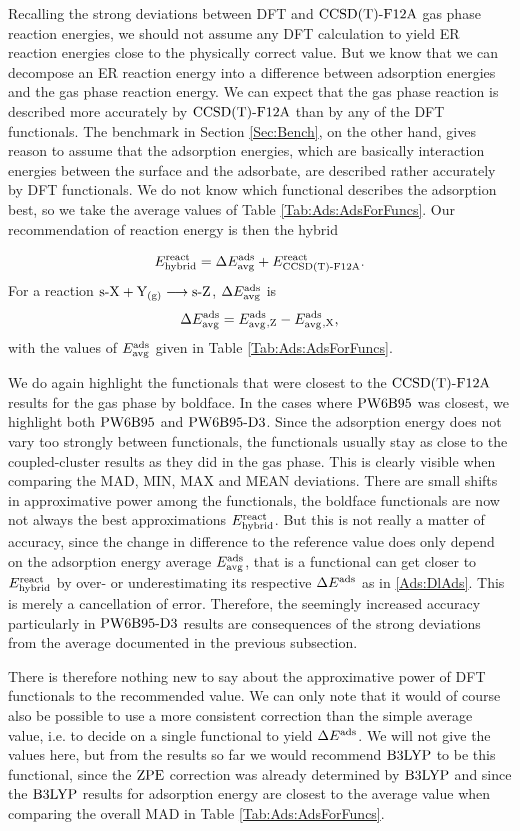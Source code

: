 \documentclass[8.5pt,twoside,twocolumn]{article}
\newcommand\zpe{\enmat{\te{ZPE}}}
\newcommand\eads{\enmat{E^{\te{ads}}}}
\newcommand\ere{\enmat{E^{\te{react}}}}
\newcommand\sur{\enmat{\te{s-}}}
\newcommand\gas{\enmat{_\te{(g)}}}
\theoremstyle{standard}
\begin{document}
Recalling the strong deviations between DFT and $\text{CCSD(T)-F12A}$ gas phase
reaction energies, we should not assume any DFT calculation to yield
ER reaction energies close to the physically correct value. But we know
that we can decompose an ER reaction energy into a difference between
adsorption energies and the gas phase reaction energy. We can expect that
the gas phase reaction is described more accurately by $\text{CCSD(T)-F12A}$ than by
any of the DFT functionals. The benchmark in Section \ref{Sec:Bench}, on
the other hand, gives reason to assume that the adsorption energies, which
are basically interaction energies between the surface and the adsorbate,
are described rather accurately by DFT functionals. We do not know which
functional describes the adsorption best, so we take the average values
of Table \ref{Tab:Ads:AdsForFuncs}. Our recommendation of reaction
energy is then the hybrid

\begin{equation}
 \erehyb=\Dl\avg + \ere_{\ccsdtf}.
\end{equation}
For a reaction $\sur\X+\Y\gas\chemar\sur\Z$, $\Delta E_{\text {avg}}^{\text{ads}}$ is
\begin{equation}
 \Delta E_{\text {avg}}^{\text{ads}} = E_{\text {avg}}^{\text{ads}}{_{,\text Z}} - E_{\text {avg}}^{\text{ads}}{_{,\text X}},
 \label{Ads:DlAds}
\end{equation}
with the values of $E_{\text {avg}}^{\text{ads}}$ given in Table \ref{Tab:Ads:AdsForFuncs}. 

We do again highlight the functionals that were closest to the $\text{CCSD(T)-F12A}$
results for the gas phase by boldface. In the cases where $\text{PW6B95}$ was closest,
we highlight both $\text{PW6B95}$ and $\text{PW6B95}\text{-D3}$. Since the adsorption energy does not vary too 
strongly between functionals, the functionals usually stay 
as close to the coupled-cluster results as they did in the gas phase. This
is clearly visible when comparing the MAD, MIN, MAX and MEAN deviations.
There are small shifts in approximative power among the functionals,
the boldface functionals are now not always the best approximations $\erehyb$.
But this is not really a matter of accuracy, since the change in difference
to the reference value does only depend on the adsorption energy average $E_{\text {avg}}^{\text{ads}}$,
that is a functional can get closer to $\erehyb$ by over- or underestimating
its respective $\Dl\eads$ as in \eqref{Ads:DlAds}. This is merely a cancellation
of error. Therefore, the seemingly increased accuracy particularly in
$\text{PW6B95}\text{-D3}$ results are consequences of the strong deviations from the average
documented in the previous subsection.

There is therefore nothing new to say about the approximative power of DFT
functionals to the recommended value. We can only note that it would
of course also be possible to use a more consistent correction than the simple
average value, i.e. to decide on a single functional to yield $\Dl\eads$.
We will not give the values here, but from the results so far we would
recommend $\text{B3LYP}$ to be this functional, since the $\zpe$ correction
was already determined by $\text{B3LYP}$ and since the $\text{B3LYP}$ results for
adsorption energy are closest to the average value when comparing the
overall MAD in Table \ref{Tab:Ads:AdsForFuncs}. 
\end{document}
